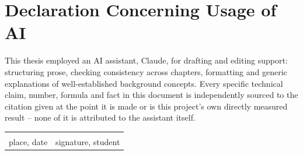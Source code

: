 
\chapter*{Declaration Concerning Usage of AI}
\thispagestyle{empty}

\noindent
This thesis employed an AI assistant, Claude,
for drafting and editing support: structuring prose, checking
consistency across chapters, formatting and generic explanations of
well-established background concepts. Every specific technical claim,
number, formula and fact in this document is independently sourced to
the citation given at the point it is made or is this project's own
directly measured result -- none of it is attributed to the assistant
itself.

\vspace{2cm}
\noindent
\begin{tabular}{@{}p{6cm}p{6cm}@{}}
\hrulefill & \hrulefill \\
place, date & signature, student \\
\end{tabular}

\clearpage
